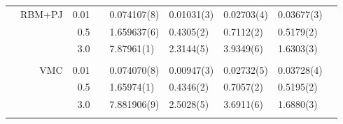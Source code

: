 \begin{table}
\begin{tabularx}{\textwidth}{R{1cm}rrcR{2.3cm}R{2.3cm}R{2.3cm}R{2.3cm}R{0.3cm}}
		&RBM+PJ & 0.01 && 0.074107(8) & 0.01031(3) & 0.02703(4) & 0.03677(3) \\
		&& 0.5 && 1.659637(6) & 0.4305(2) & 0.7112(2) & 0.5179(2)\\
		&& 3.0 && 7.87961(1) & 2.3144(5) & 3.9349(6) & 1.6303(3) \\ \hdashline \\
		
		&VMC & 0.01 && 0.074070(8) & 0.00947(3) & 0.02732(5) & 0.03728(4) \\
		&& 0.5 && 1.65974(1) & 0.4346(2) & 0.7057(2) & 0.5195(2) & \\
		&& 3.0 && 7.881906(9) & 2.5028(5) & 3.6911(6) & 1.6880(3) \\ \hdashline \\
	\end{tabularx}
\end{table} 
